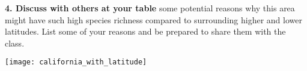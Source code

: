\documentclass[11pt]{article}
\begin{document}
%
%
%
%
%

\textbf{4. Discuss with others at your table} some potential reasons why this area might have such high
species richness compared to surrounding higher and lower latitudes.
List some of your reasons and be prepared to share them with the class.

\newpage

\begin{center}
	\texttt{[image: california\_with\_latitude]}
\end{center}


\newpage
\end{document}
